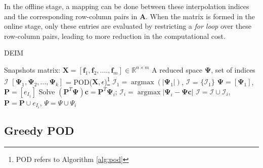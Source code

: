 \documentclass[]{interact}
\DeclareMathOperator{\argmaxH}{argmax}
\newcommand\abs[1]{\left|#1\right|}
\theoremstyle{plain}%
\theoremstyle{definition}
\theoremstyle{remark}
\begin{document}
In the offline stage, a mapping can be done between these interpolation indices and the corresponding row-column pairs in $\mathbf{A}$.
When the matrix is formed in the online stage, only these entries are evaluated by restricting a \textit{for loop } over these row-column pairs, leading to more reduction in the computational cost.

\noindent\begin{minipage}{\textwidth}
	\renewcommand\footnoterule{}
	\begin{algorithm}[H]
		\caption{DEIM}
		\label{alg:DEIM}
		\begin{algorithmic}[1]
			\REQUIRE Snapshots matrix: $\mathbf{X} = [\mathbf{f}_1, \mathbf{f}_2,  ...., \mathbf{f}_m] \in \mathbb{R}^{n\times m}$
			\ENSURE A reduced space $\mathbf{\Psi}$, set of indices $\mathcal{I}$
			\STATE $[\mathbf{\Psi}_1, \mathbf{\Psi}_2, ..., \mathbf{\Psi}_k ]$ = POD(${\mathbf{X}}, \epsilon$)\footnote{POD refers to Algorithm \ref{alg:pod}}
			\STATE $\mathcal{I}_1 = \argmaxH(\abs{\mathbf{\Psi}_1})$, $\mathcal{I}$ = $\{\mathcal{I}_1\}$
			\STATE $\mathbf{\Psi} = [\mathbf{\Psi}_1]$, $\mathbf{P} =[e_{I_1}]$
			\STATE Solve $(\mathbf{P}^T\mathbf{\Psi})\mathbf{c} = \mathbf{P}^T\mathbf{\Psi}_i$;
			\STATE $\mathcal{I}_i = \argmaxH{\abs{\mathbf{\Psi}_i - \mathbf{\Psi}\mathbf{c}}}$
			\STATE $\mathcal{I} = \mathcal{I} \cup \mathcal{I}_i$, $\mathbf{P} = \mathbf{P} \cup e_{I_i}$, ${\Psi = \Psi \cup \Psi_i}$
			\ENDFOR
		\end{algorithmic}
	\end{algorithm}
\end{minipage}


\subsection{Greedy POD}
\end{document}
